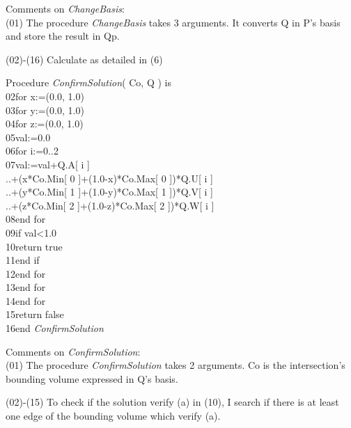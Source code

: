 \documentclass[12pt, a4paper]{article}
\begin{document}
Comments on {\em ChangeBasis}:\\

(01) The procedure {\em ChangeBasis} takes 3 arguments. It converts Q in P's basis and store the result in Qp.

(02)-(16) Calculate as detailed in (6)\\

\begin{ttfamily}
\quad Procedure {\em ConfirmSolution}( Co, Q ) is\\
02\quad\quad for x:=(0.0, 1.0)\\
03\quad\quad\quad for y:=(0.0, 1.0)\\
04\quad\quad\quad\quad for z:=(0.0, 1.0)\\
05\quad\quad\quad\quad\quad val:=0.0\\
06\quad\quad\quad\quad\quad for i:=0..2\\
07\quad\quad\quad\quad\quad\quad val:=val+Q.A[ i ]\\
..\quad\quad\quad\quad\quad\quad\quad +(x*Co.Min[ 0 ]+(1.0-x)*Co.Max[ 0 ])*Q.U[ i ]\\
..\quad\quad\quad\quad\quad\quad\quad +(y*Co.Min[ 1 ]+(1.0-y)*Co.Max[ 1 ])*Q.V[ i ]\\
..\quad\quad\quad\quad\quad\quad\quad +(z*Co.Min[ 2 ]+(1.0-z)*Co.Max[ 2 ])*Q.W[ i ]\\
08\quad\quad\quad\quad\quad end for\\
09\quad\quad\quad\quad\quad if val<1.0\\
10\quad\quad\quad\quad\quad\quad return true\\
11\quad\quad\quad\quad\quad end if \\
12\quad\quad\quad\quad end for\\
13\quad\quad\quad end for\\
14\quad\quad end for\\
15\quad\quad return false\\
16\quad end {\em ConfirmSolution}\\
\end{ttfamily}

Comments on {\em ConfirmSolution}:\\

(01) The procedure {\em ConfirmSolution} takes 2 arguments. Co is the intersection's bounding volume expressed in Q's basis.

(02)-(15) To check if the solution verify (a) in (10), I search if there is at least one edge of the bounding volume which verify (a).\\
\end{document}
